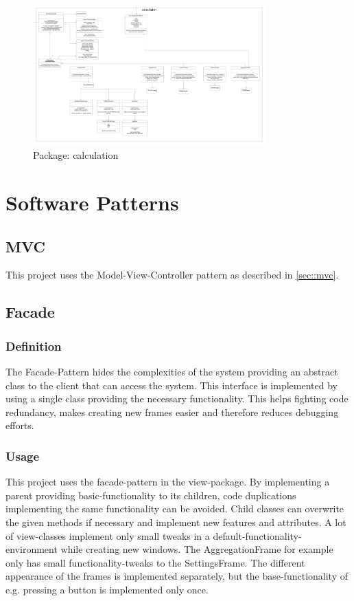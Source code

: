 \documentclass[parskip=full]{scrartcl} %
\begin{document}
\hypertarget{calculation}{
\begin{figure}[hbt!]
  \centering
\includegraphics[width=0.8\textwidth]
        {pictures/calculation.png}
  \caption{Package: calculation}
  \label{fig:mvc}
\end{figure}
}
\newpage




\section{Software Patterns}

\subsection{MVC}
This project uses the Model-View-Controller pattern as described in \ref{sec::mvc}.

\subsection{Facade}
\subsubsection{Definition}
The Facade-Pattern hides the complexities of the system providing an abstract class to the client that can access the system. This interface is implemented by using a single class providing the necessary functionality. This helps fighting code redundancy, makes creating new frames easier and therefore reduces debugging efforts.
\subsubsection{Usage}
This project uses the facade-pattern in the view-package. By implementing a parent providing basic-functionality to its children, code duplications implementing the same functionality can be avoided. Child classes can overwrite the given methods if necessary and implement new features and attributes.
A lot of view-classes implement only small tweaks in a default-functionality-environment while creating new windows. The AggregationFrame for example only has small functionality-tweaks to the SettingsFrame. The different appearance of the frames is implemented separately, but the base-functionality of e.g. pressing a button is implemented only once.
\end{document}
